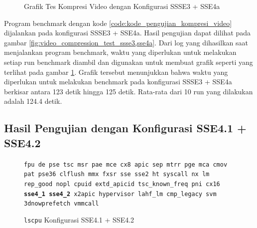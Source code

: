 \begin{figure}
    \centering
    \caption{Grafik Tes Kompresi Video dengan Konfigurasi SSSE3 + SSE4a}
    \label{fig:video_compression_test_ssse3,sse4a_graph}
\end{figure}

Program benchmark dengan kode \ref{code:kode_pengujian_kompresi_video} dijalankan pada konfigurasi SSSE3 + SSE4a. Hasil pengujian dapat dilihat pada gambar \ref{fig:video_compression_test_ssse3,sse4a}. Dari log yang dihasilkan saat menjalankan program benchmark, waktu yang diperlukan untuk melakukan setiap run benchmark diambil dan digunakan untuk membuat grafik seperti yang terlihat pada gambar \ref{fig:video_compression_test_ssse3,sse4a_graph}. Grafik tersebut menunjukkan bahwa waktu yang diperlukan untuk melakukan benchmark pada konfigurasi SSSE3 + SSE4a berkisar antara 123 detik hingga 125 detik. Rata-rata dari 10 run yang dilakukan adalah 124.4 detik.

\subsection{Hasil Pengujian dengan Konfigurasi SSE4.1 + SSE4.2}
\begin{figure}
    \texttt{fpu de pse tsc msr pae mce cx8 apic sep mtrr pge mca cmov pat pse36 clflush mmx fxsr sse sse2 ht syscall nx lm rep\_good nopl cpuid extd\_apicid tsc\_known\_freq pni cx16 \textbf{sse4\_1} \textbf{sse4\_2} x2apic hypervisor lahf\_lm cmp\_legacy svm 3dnowprefetch vmmcall}
    \caption{\texttt{lscpu} Konfigurasi SSE4.1 + SSE4.2}
    \label{fig:lscpu_video_compression_test_sse4.1,sse4.2}
\end{figure}

